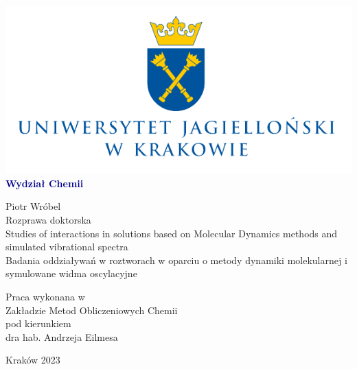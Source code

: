 \thispagestyle{empty}
\begin{center}
  \includegraphics[width=7.cm]{img/logo.png} \\
  \large \textbf{\textcolor{darkblue}{Wydział Chemii}}
  
  \vspace{2.5cm}
  \LARGE {Piotr Wróbel} \\
  \vspace{0.5cm}
  \huge {Rozprawa doktorska} \\
  \vspace{0.5cm}
  \Large{Studies of interactions in solutions based on Molecular Dynamics methods and simulated vibrational spectra} \\
  \vspace{0.5cm}
  \large {Badania oddziaływań w roztworach w oparciu o metody dynamiki molekularnej i symulowane widma oscylacyjne} \\
\end{center}

\vfill

\begin{flushleft}
  \large  
  Praca wykonana w \\
  Zakładzie Metod Obliczeniowych Chemii \\
  pod kierunkiem \\
  dra hab. Andrzeja Eilmesa \\
\end{flushleft}

\vspace{0.5cm}
\begin{center}
  \normalsize
  \vspace{0.5cm}
  \large Kraków 2023
\end{center}
\vfill